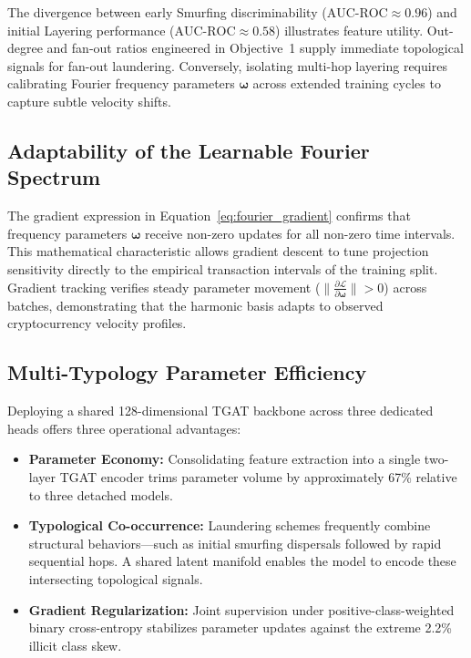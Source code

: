 The divergence between early Smurfing discriminability ($\text{AUC-ROC} \approx 0.96$) and initial Layering performance ($\text{AUC-ROC} \approx 0.58$) illustrates feature utility. Out-degree and fan-out ratios engineered in Objective~1 supply immediate topological signals for fan-out laundering. Conversely, isolating multi-hop layering requires calibrating Fourier frequency parameters $\boldsymbol{\omega}$ across extended training cycles to capture subtle velocity shifts.

\subsection{Adaptability of the Learnable Fourier Spectrum}

The gradient expression in Equation~\ref{eq:fourier_gradient} confirms that frequency parameters $\boldsymbol{\omega}$ receive non-zero updates for all non-zero time intervals. This mathematical characteristic allows gradient descent to tune projection sensitivity directly to the empirical transaction intervals of the training split. Gradient tracking verifies steady parameter movement ($\|\frac{\partial \mathcal{L}}{\partial \boldsymbol{\omega}}\| > 0$) across batches, demonstrating that the harmonic basis adapts to observed cryptocurrency velocity profiles.

\subsection{Multi-Typology Parameter Efficiency}

Deploying a shared 128-dimensional TGAT backbone across three dedicated heads offers three operational advantages:
\begin{itemize}
    \item \textbf{Parameter Economy:} Consolidating feature extraction into a single two-layer TGAT encoder trims parameter volume by approximately 67\% relative to three detached models.
    \item \textbf{Typological Co-occurrence:} Laundering schemes frequently combine structural behaviors—such as initial smurfing dispersals followed by rapid sequential hops. A shared latent manifold enables the model to encode these intersecting topological signals.
    \item \textbf{Gradient Regularization:} Joint supervision under positive-class-weighted binary cross-entropy stabilizes parameter updates against the extreme 2.2\% illicit class skew.
\end{itemize}

